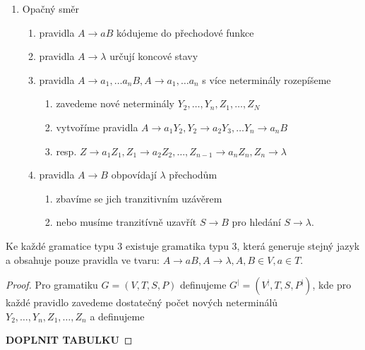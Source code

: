 \documentclass[../main.tex]{subfiles}
\begin{document}
\begin{enumerate}
    \item Opačný směr
    \begin{enumerate}
        \item pravidla $A \rightarrow aB$ kódujeme do přechodové funkce
        \item pravidla $A \rightarrow \lambda$ určují koncové stavy
        \item pravidla $A \rightarrow a_1,\dots a_n B, A \rightarrow a_1,\dots a_n$ s více neterminály rozepíšeme
        \begin{enumerate}
            \item zavedeme nové neterminály $Y_2,\dots, Y_n, Z_1,\dots, Z_N$
            \item vytvoříme pravidla $A \rightarrow a_1Y_2, Y_2 \rightarrow a_2Y_3,\dots Y_n \rightarrow a_n B$
            \item resp. $Z \rightarrow a_1Z_1, Z_1 \rightarrow a_2Z_2,\dots, Z_{n-1} \rightarrow a_nZ_n, Z_n \rightarrow \lambda$
        \end{enumerate}
        \item pravidla $A \rightarrow B$ obpovídají $\lambda$ přechodům
        \begin{enumerate}
            \item zbavíme se jich tranzitivním uzávěrem
            \item nebo musíme tranzitívně uzavřít $S\rightarrow B$ pro hledání $S \rightarrow \lambda$.
        \end{enumerate}
    \end{enumerate}
\end{enumerate}

\begin{theorem}
    Ke každé gramatice typu 3 existuje gramatika typu 3, která generuje stejný jazyk a 
    obsahuje pouze pravidla ve tvaru: $A \rightarrow aB, A \rightarrow \lambda, A,B \in V, a\in T$.
\end{theorem}
\begin{proof}
    Pro gramatiku $G = (V,T,S,P)$ definujeme $G^| = (V^|,T,S,P^|)$, kde pro každé pravidlo zavedeme dostatečný počet nových
    neterminálů $Y_2,\dots, Y_n, Z_1,\dots, Z_n$ a definujeme
    
    \textbf{DOPLNIT TABULKU}
\end{proof}
\end{document}
